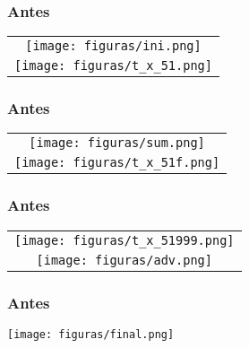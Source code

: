 \documentclass[xcolor=dvipsnames,10pt,aspectratio=169]{beamer}
\begin{document}
		\begin{frame}
			\frametitle{Antes}
			\centering
			\begin{tabular}{c}
				{\texttt{[image: figuras/ini.png]}}\\{\texttt{[image: figuras/t\_x\_51.png]}}
			\end{tabular}
	
		\end{frame}

		\begin{frame}
			\frametitle{Antes}
			\centering
			\begin{tabular}{c}
				
				{\texttt{[image: figuras/sum.png]}}\\{\texttt{[image: figuras/t\_x\_51f.png]}}\\
				
			\end{tabular}
			
		\end{frame}
	
		\begin{frame}
			\frametitle{Antes}
			\centering
			\begin{tabular}{c}
				
				{\texttt{[image: figuras/t\_x\_51999.png]}}\\ {\texttt{[image: figuras/adv.png]}}
				
			\end{tabular}
			
		\end{frame}
		
		\begin{frame}
			\frametitle{Antes}
			\centering
				\texttt{[image: figuras/final.png]}
		\end{frame}
		
\end{document}
